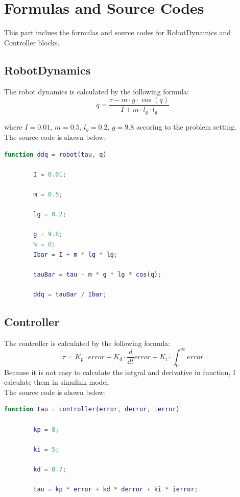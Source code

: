 \documentclass{article}
\begin{document}
\section{Formulas and Source Codes}
This part inclues the formulas and source codes for RobotDynamics and Controller blocks.
\subsection*{RobotDynamics}
The robot dynamics is calculated by the following formula:
\begin{equation}
    \ddot{q} = \frac{\tau - m \cdot g \cdot \cos(q)}{I + m \cdot l_g \cdot l_g}
\end{equation}

where $I = 0.01$, $m = 0.5$, $l_g = 0.2$, $g = 9.8$ accoring to the problem setting.\\
\newpage
The source code is shown below:
\begin{lstlisting}[language=Matlab]
    function ddq = robot(tau, q)

        I = 0.01;
    
        m = 0.5;
    
        lg = 0.2;
    
        g = 9.8;
        % = 0;
        Ibar = I + m * lg * lg;
    
        tauBar = tau - m * g * lg * cos(q);
    
        ddq = tauBar / Ibar;
\end{lstlisting}

\subsection*{Controller}
The controller is calculated by the following formula:
\begin{equation}
    \tau = K_p \cdot error + K_d \cdot \frac{d}{dt}error + K_i \cdot \int_{0}^{\infty}error
\end{equation}
Because it is not easy to calculate the intgral and derivative in function, I calculate them in simulink model.\\
\break
The source code is shown below:
\begin{lstlisting}[language=Matlab]
    function tau = controller(error, derror, ierror)

        kp = 8;
    
        ki = 5;
    
        kd = 0.7;
    
        tau = kp * error + kd * derror + ki * ierror;
\end{lstlisting}
\end{document}
